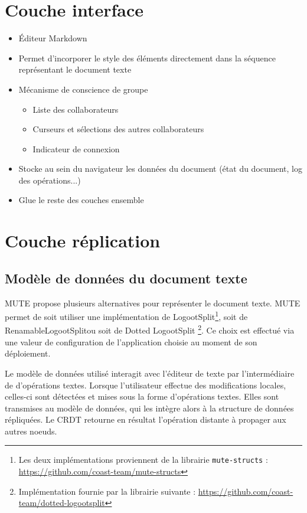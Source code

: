 \documentclass[12pt]{thesul}
\begin{document}
\section{Couche interface}

\begin{itemize}
  \item Éditeur Markdown
  \item Permet d'incorporer le style des éléments directement dans la séquence représentant le document texte
  \item Mécanisme de conscience de groupe
  \begin{itemize}
    \item Liste des collaborateurs
    \item Curseurs et sélections des autres collaborateurs
    \item Indicateur de connexion
  \end{itemize}
  \item Stocke au sein du navigateur les données du document (état du document, log des opérations...)
  \item Glue le reste des couches ensemble
\end{itemize}

\section{Couche réplication}

\subsection{Modèle de données du document texte}

MUTE propose plusieurs alternatives pour représenter le document texte.
MUTE permet de soit utiliser une implémentation de LogootSplit\footnote{Les deux implémentations proviennent de la librairie \texttt{mute-structs} : \url{https://github.com/coast-team/mute-structs}}, soit de RenamableLogootSplit\footnotemark[\value{footnote}] ou soit de Dotted LogootSplit \footnote{Implémentation fournie par la librairie suivante : \url{https://github.com/coast-team/dotted-logootsplit}}.
Ce choix est effectué via une valeur de configuration de l'application choisie au moment de son déploiement.

Le modèle de données utilisé interagit avec l'éditeur de texte par l'intermédiaire de d'opérations textes.
Lorsque l'utilisateur effectue des modifications locales, celles-ci sont détectées et mises sous la forme d'opérations textes.
Elles sont transmises au modèle de données, qui les intègre alors à la structure de données répliquées.
Le \ac{CRDT} retourne en résultat l'opération distante à propager aux autres noeuds.
\end{document}
